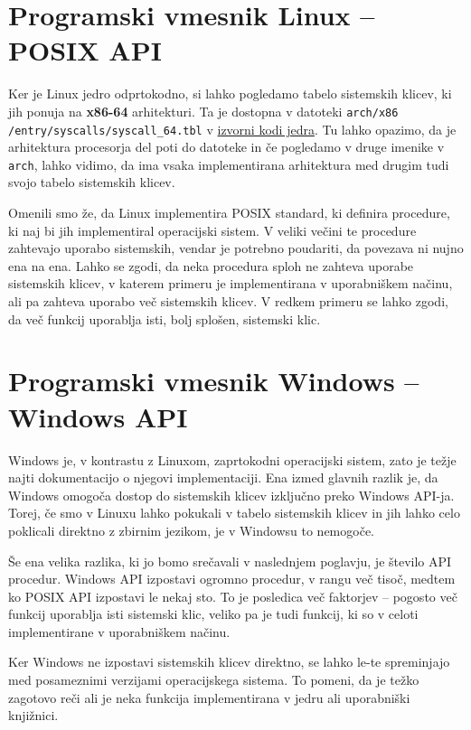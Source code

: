 \documentclass[a4paper,12pt,openright]{book}
\begin{document}
\section{Programski vmesnik Linux -- POSIX API}

Ker je Linux jedro odprtokodno, si lahko pogledamo tabelo sistemskih klicev, ki jih ponuja na \textbf{x86-64} arhitekturi.
Ta je dostopna v datoteki \texttt{arch/x86} \texttt{/entry/syscalls/syscall\_64.tbl} v \href{https://github.com/torvalds/linux}{izvorni kodi jedra}.
Tu lahko opazimo, da je arhitektura procesorja del poti do datoteke in če pogledamo v druge imenike v \texttt{arch}, lahko vidimo, da ima vsaka implementirana arhitektura med drugim tudi svojo tabelo sistemskih klicev.

Omenili smo že, da Linux implementira POSIX standard, ki definira procedure, ki naj bi jih implementiral operacijski sistem.
V veliki večini te procedure zahtevajo uporabo sistemskih, vendar je potrebno poudariti, da povezava ni nujno ena na ena.
Lahko se zgodi, da neka procedura sploh ne zahteva uporabe sistemskih klicev, v katerem primeru je implementirana v uporabniškem načinu, ali pa zahteva uporabo več sistemskih klicev.
V redkem primeru se lahko zgodi, da več funkcij uporablja isti, bolj splošen, sistemski klic.

\section{Programski vmesnik Windows -- Windows API}

Windows je, v kontrastu z Linuxom, zaprtokodni operacijski sistem, zato je težje najti dokumentacijo o njegovi implementaciji.
Ena izmed glavnih razlik je, da Windows omogoča dostop do sistemskih klicev izključno preko Windows API-ja.
Torej, če smo v Linuxu lahko pokukali v tabelo sistemskih klicev in jih lahko celo poklicali direktno z zbirnim jezikom, je v Windowsu to nemogoče.

Še ena velika razlika, ki jo bomo srečavali v naslednjem poglavju, je število API procedur.
Windows API izpostavi ogromno procedur, v rangu več tisoč, medtem ko POSIX API izpostavi le nekaj sto.
To je posledica več faktorjev -- pogosto več funkcij uporablja isti sistemski klic, veliko pa je tudi funkcij, ki so v celoti implementirane v uporabniškem načinu.

Ker Windows ne izpostavi sistemskih klicev direktno, se lahko le-te spreminjajo med posameznimi verzijami operacijskega sistema.
To pomeni, da je težko zagotovo reči ali je neka funkcija implementirana v jedru ali uporabniški knjižnici.
\cite{Tanenbaum_Bos_2023}
\end{document}
